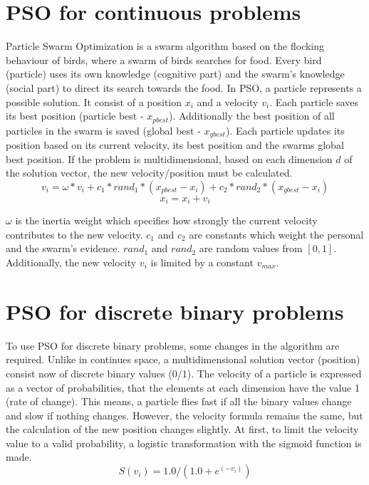 \documentclass{article}
\begin{document}
\section{PSO for continuous problems}
\label{lbl-pso-cont}
Particle Swarm Optimization is a swarm algorithm based on the flocking behaviour of birds, where a swarm of birds searches for food. Every bird (particle) uses its own knowledge (cognitive part) and the swarm's knowledge (social part) to direct its search towards the food. In PSO, a particle represents a possible solution. It consist of a position $x_i$ and a velocity $v_i$. Each particle saves its best position (particle best - $x_{pbest}$). Additionally the best position of all particles in the swarm is saved (global best - $x_{gbest}$). Each particle updates its position based on its current velocity, its best position and the swarms global best position. If the problem is multidimensional, based on each dimension $d$ of the solution vector, the new velocity/position must be calculated.
\begin{equation}
\label{formula-1}
v_i = \omega * v_i + c_1 * rand_1 * (x_{pbest} - x_i) + c_2 * rand_2 * (x_{gbest} - x_i)
\end{equation}
\begin{equation}
\label{formula-2}
x_i = x_i + v_i
\end{equation}

$\omega$ is the inertia weight which specifies how strongly the current velocity contributes to the new velocity. $c_1$ and $c_2$ are constants which weight the personal and the swarm's evidence. $rand_1$ and $rand_2$ are random values from $[0,1]$. Additionally, the new velocity $v_i$ is limited by a constant $v_{max}$.

\section{PSO for discrete binary problems}
\label{lbl-pso-disc}
To use PSO for discrete binary problems, some changes in the algorithm are required. Unlike in continues space, a multidimensional solution vector (position) consist now of discrete binary values (0/1). The velocity of a particle is expressed as a vector of probabilities, that the elements at each dimension have the value 1 (rate of change). This means, a particle flies fast if all the binary values change and slow if nothing changes. However, the velocity formula remains the same, but the calculation of the new position changes slightly. At first, to limit the velocity value to a valid probability, a logistic transformation with the sigmoid function is made.
\begin{equation}
\label{formula-3}
S(v_i) = 1.0 / (1.0 + e^{(-v_i)})
\end{equation}
\end{document}
